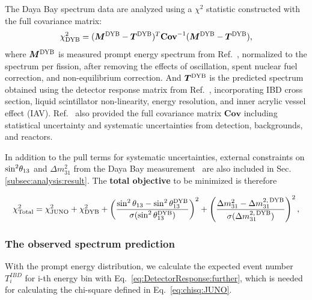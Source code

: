 The Daya Bay spectrum data are analyzed using a $\chi^2$ statistic constructed with the full covariance matrix:
\begin{equation}
    \chi^2_{\text{DYB}} = (\boldsymbol{M}^{\rm DYB} - \boldsymbol{T}^{\rm DYB})^T\mathbf{Cov}^{-1}(\boldsymbol{M}^{\rm DYB} - \boldsymbol{T}^{\rm DYB})\label{eq:Chisq:DYB},
\end{equation}
where $\boldsymbol{M}^{\rm DYB}$ is measured prompt energy spectrum from Ref.~\cite{DYB:Flux2025}, normalized to the spectrum per fission, after removing the effects of oscillation, spent nuclear fuel correction, and non-equilibrium correction. And $\boldsymbol{T}^{\rm DYB}$ is the predicted spectrum obtained using the detector response matrix from Ref.~\cite{DYB:Flux2025}, incorporating IBD cross section, liquid scintillator non-linearity, energy resolution, and inner acrylic vessel effect (IAV). Ref.~\cite{DYB:Flux2025} also provided the full covariance matrix $\mathbf{Cov}$ including statistical uncertainty and systematic uncertainties from detection, backgrounds, and reactors.


In addition to the pull terms for systematic uncertainties, external constraints on $\rm{sin}^2\theta_{13}$ and $\Delta m^2_{31}$ from the Daya Bay measurement~\cite{an2023precision} are also included in Sec.\ref{subsec:analysis:result}. The \textbf{total objective} to be minimized is therefore

\begin{equation}
\chi^2_{\text{Total}}
= \chi^2_{\text{JUNO}} + \chi^2_{\text{DYB}}
+ \left( \frac{\sin^2\theta_{13} - \sin^2\theta_{13}^{\rm DYB}}{\sigma(\sin^2\theta_{13}^{\rm DYB})} \right)^2
+ \left( \frac{\Delta m_{31}^2 - \Delta m_{31}^{2,\,\rm DYB}}{\sigma(\Delta m_{31}^{2,\,\rm DYB})} \right)^2 ,
\label{eq:Chisq:Total}
\end{equation}

\subsubsection{The observed spectrum prediction}
\label{subsubsec:obs-spectrum}
With the prompt energy distribution, we calculate the expected event number $T_{i}^{IBD}$ for i-th energy bin with Eq.~\eqref{eq:DetectorResponse:further}, which is needed for calculating the chi-square defined in Eq.~\eqref{eq:chisq:JUNO}.

